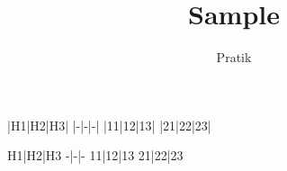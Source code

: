 \documentclass[12pt]{article}
\begin{document}
\title{Sample}
\author{Pratik}\maketitle

|H1|H2|H3|
|-|-|-|
|11|12|13|
|21|22|23|

H1|H2|H3
-|-|-
11|12|13
21|22|23
\end{document}

